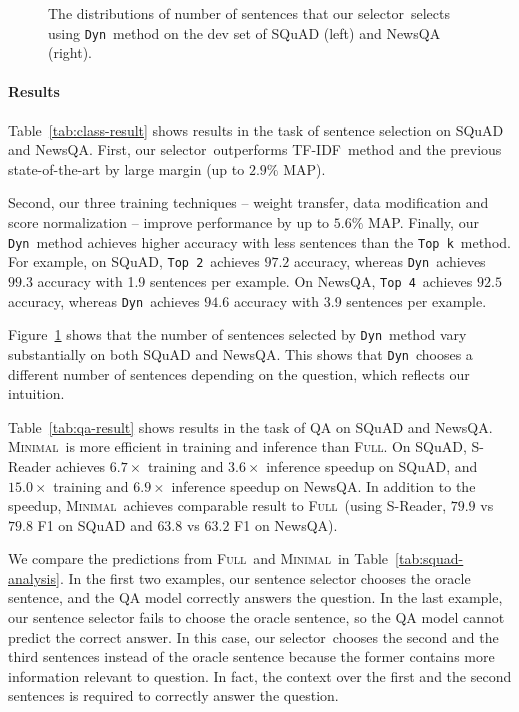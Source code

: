 \documentclass[11pt,a4paper]{article}
\newcommand{\topk}{{\tt Top k}}
\newcommand{\dyn}{{\tt Dyn}}
\newcommand{\toptwo}{{\tt Top 2}}
\newcommand{\topfour}{{\tt Top 4}}
\newcommand{\full}{\textsc{Full}}
\newcommand{\ours}{\textsc{Minimal}}
\newcommand{\tfidf}{TF-IDF}
\newcommand{\ourselector}{our selector}
\begin{document}
\begin{figure}[!ht]
\centering
{}
\caption{
The distributions of number of sentences that \ourselector~selects using \dyn~method on the dev set of SQuAD (left) and NewsQA (right).
}
\label{fig:num-of-sentences}
\end{figure}


\paragraph{Results}
Table~\ref{tab:class-result} shows results in the task of sentence selection on SQuAD and NewsQA.
First, \ourselector~outperforms \tfidf~method and the previous state-of-the-art by large margin (up to $2.9\%$ MAP).


Second, our three training techniques -- weight transfer, data modification and score normalization -- improve performance by up to $5.6\%$ MAP. 
Finally, our \dyn~method achieves higher accuracy with less sentences than the \topk~method.
For example, on SQuAD, \toptwo~achieves $97.2$ accuracy, whereas \dyn~achieves $99.3$ accuracy with 1.9 sentences per example.
On NewsQA, \topfour~achieves $92.5$ accuracy, whereas \dyn~achieves $94.6$ accuracy with 3.9 sentences per example. 

Figure~\ref{fig:num-of-sentences} shows that the number of sentences selected by \dyn~method vary substantially on both SQuAD and NewsQA.
This shows that \dyn~chooses a different number of sentences depending on the question, which reflects our intuition.


Table~\ref{tab:qa-result} shows results in the task of QA on SQuAD and NewsQA.
\ours~is more efficient in training and inference than \full.
On SQuAD, S-Reader achieves $6.7\times$ training and $3.6\times$ inference speedup on SQuAD, and $15.0\times$ training and $6.9\times$ inference speedup on NewsQA.
In addition to the speedup, \ours~achieves comparable result to \full~(using S-Reader, $79.9$ vs $79.8$ F1 on SQuAD and $63.8$ vs $63.2$ F1 on NewsQA).

We compare the predictions from \full~and \ours~in Table~\ref{tab:squad-analysis}.
In the first two examples, our sentence selector chooses the oracle sentence, and the QA model correctly answers the question.
In the last example, our sentence selector fails to choose the oracle sentence, so the QA model cannot predict the correct answer. 
In this case, \ourselector~chooses the second and the third sentences instead of the oracle sentence because the former contains more information relevant to question. In fact, the context over the first and the second sentences is required to correctly answer the question.
\end{document}
